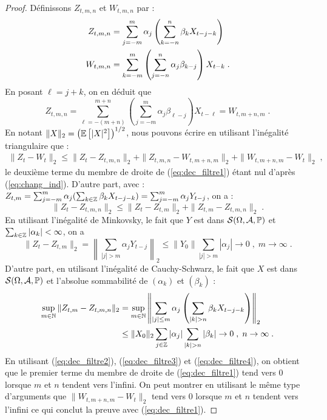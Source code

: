 \begin{proof}
D\'efinissons $Z_{t,m,n}$ et $W_{t,m,n}$ par :
\begin{align*}
Z_{t,m,n} &=\sum_{j=-m}^m\alpha_j \left(\sum_{k=-n}^n\beta_k X_{t-j-k}\right) \\
W_{t,m,n} &=\sum_{k=-m}^m \left(\sum_{j=-n}^n\alpha_j\beta_{k-j} \right)X_{t-k} \;.
\end{align*}
En posant $\ell=j+k$, on en d\'eduit que
\begin{equation}\label{eq:chang_ind}
Z_{t,m,n}=\sum_{\ell=-(m+n)}^{m+n}(\sum_{j=-m}^m\alpha_j\beta_{\ell-j})X_{t-\ell}
=W_{t,m+n,m}\;.
\end{equation}
En notant $\| X \|_2 = \left( {\mathbb E}\left[ |X|^2 \right] \right)^{1/2}$, nous pouvons
\'ecrire en utilisant l'in\'egalit\'e triangulaire que :
\begin{multline}\label{eq:dec_filtre1}
\|Z_t-W_t\|_2\leq \|Z_t-Z_{t,m,n}\|_2+\|Z_{t,m,n}-W_{t,m+n,m}\|_2
+\|W_{t,m+n,m}-W_t\|_2\;,
\end{multline}
le deuxi\`eme terme du membre de droite de (\ref{eq:dec_filtre1}) \'etant
nul d'apr\`es (\ref{eq:chang_ind}).
D'autre part, avec :
$Z_{t,m}=\sum_{j=-m}^m\alpha_j(\sum_{k\in\mathbb{Z}}\beta_k X_{t-j-k})
=\sum_{j=-m}^m\alpha_j Y_{t-j}$, on a :
\begin{equation}\label{eq:dec_filtre2}
\|Z_t-Z_{t,m,n}\|_2\leq\|Z_t-Z_{t,m}\|_2+\|Z_{t,m}-Z_{t,m,n}\|_2\;.
\end{equation}
En utilisant l'in\'egalit\'e de Minkovsky, le fait que
$Y$ est dans $\mathcal{S}(\Omega,\mathcal{A},\mathbb{P})$ et $\sum_{k\in\mathbb{Z}}|\alpha_k|<\infty$,  on a
\begin{equation}\label{eq:dec_filtre3}
\|Z_t-Z_{t,m}\|_2 =\left\|\sum_{|j|>m}\alpha_j Y_{t-j}\right\|_2  \leq \| Y_0 \| \sum_{|j|>m} |\alpha_j|\to 0\;,\; m\to\infty\;.
\end{equation}
D'autre part, en utilisant l'in\'egalit\'e de Cauchy-Schwarz, le fait que
$X$ est dans $\mathcal{S}(\Omega,\mathcal{A},\mathbb{P})$ et l'absolue sommabilit\'e de $(\alpha_k)$
et $(\beta_k)$ :
\begin{align}\label{eq:dec_filtre4}
\sup_{m \in \nset} \|Z_{t,m}-Z_{t,m,n}\|_2&= \sup_{m \in \nset} \left\|\sum_{|j|\leq
  m}\alpha_j \left(\sum_{|k|>n}\beta_k X_{t-j-k} \right)\right\|_2\\
&\leq \|X_0\|_2 \sum_{j\in\zset}|\alpha_j| \sum_{|k|>n}|\beta_k|\to 0\;,\; n\to\infty\;.
\end{align}
En utilisant (\ref{eq:dec_filtre2}), (\ref{eq:dec_filtre3}) et
(\ref{eq:dec_filtre4}), on obtient que le premier terme du membre de
droite de (\ref{eq:dec_filtre1}) tend vers 0 lorsque $m$ et $n$
tendent vers l'infini.
On peut montrer en utilisant le m\^{e}me type d'arguments que
$\|W_{t,m+n,m}-W_t\|_2$
tend vers 0 lorsque $m$ et $n$ tendent vers l'infini ce qui conclut la
preuve avec (\ref{eq:dec_filtre1}).
\end{proof}


